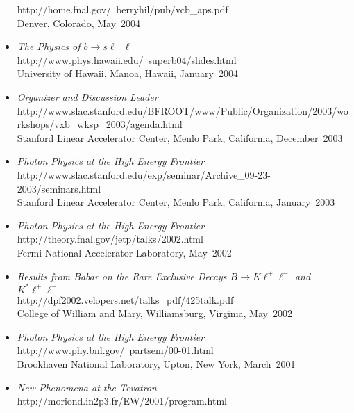 \documentclass [12pt]{report}
\begin{document}
\begin{itemize}
{
{http://home.fnal.gov/~berryhil/pub/vcb_aps.pdf}\\
Denver, Colorado, May~2004}
\item{{\em The Physics of $b\rightarrow s \ell^+ \ell^-$}\\ 
{http://www.phys.hawaii.edu/~superb04/slides.html}\\
University of Hawaii, Manoa, Hawaii, January~2004}
\item{{\em Organizer and Discussion Leader}\\ 
{http://www.slac.stanford.edu/BFROOT/www/Public/Organization/2003/workshops/vxb_wksp_2003/agenda.html}\\
Stanford Linear Accelerator Center, Menlo Park, California, December~2003}
\item{{\em Photon Physics at the High Energy Frontier}\\ 
{http://www.slac.stanford.edu/exp/seminar/Archive_09-23-2003/seminars.html}\\
Stanford Linear Accelerator Center, Menlo Park, California, January~2003}
\item{{\em Photon Physics at the High Energy Frontier}\\ 
{http://theory.fnal.gov/jetp/talks/2002.html}\\
Fermi National Accelerator Laboratory, May~2002}
\item{{\em Results from Babar on the Rare Exclusive Decays 
$B\rightarrow K\ell^+\ell^-$ and $K^{*}\ell^+\ell^-$}\\ 
{http://dpf2002.velopers.net/talks_pdf/425talk.pdf}\\
College of William and Mary, Williamsburg, Virginia, May~2002}
\item{{\em Photon Physics at the High Energy Frontier}\\ 
{http://www.phy.bnl.gov/~partsem/00-01.html}\\
Brookhaven National Laboratory, Upton, New York, March~2001}
\item{{\em New Phenomena at the Tevatron}\\ 
{http://moriond.in2p3.fr/EW/2001/program.html}\\
}
\end{itemize}
\end{document}
